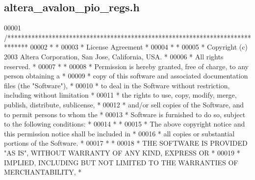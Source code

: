 \subsection{altera\+\_\+avalon\+\_\+pio\+\_\+regs.\+h}
\label{altera__avalon__pio__regs_8h_source}

\begin{DoxyCode}
00001 \textcolor{comment}{/******************************************************************************}
00002 \textcolor{comment}{*                                                                             *}
00003 \textcolor{comment}{* License Agreement                                                           *}
00004 \textcolor{comment}{*                                                                             *}
00005 \textcolor{comment}{* Copyright (c) 2003 Altera Corporation, San Jose, California, USA.           *}
00006 \textcolor{comment}{* All rights reserved.                                                        *}
00007 \textcolor{comment}{*                                                                             *}
00008 \textcolor{comment}{* Permission is hereby granted, free of charge, to any person obtaining a     *}
00009 \textcolor{comment}{* copy of this software and associated documentation files (the "Software"),  *}
00010 \textcolor{comment}{* to deal in the Software without restriction, including without limitation   *}
00011 \textcolor{comment}{* the rights to use, copy, modify, merge, publish, distribute, sublicense,    *}
00012 \textcolor{comment}{* and/or sell copies of the Software, and to permit persons to whom the       *}
00013 \textcolor{comment}{* Software is furnished to do so, subject to the following conditions:        *}
00014 \textcolor{comment}{*                                                                             *}
00015 \textcolor{comment}{* The above copyright notice and this permission notice shall be included in  *}
00016 \textcolor{comment}{* all copies or substantial portions of the Software.                         *}
00017 \textcolor{comment}{*                                                                             *}
00018 \textcolor{comment}{* THE SOFTWARE IS PROVIDED "AS IS", WITHOUT WARRANTY OF ANY KIND, EXPRESS OR  *}
00019 \textcolor{comment}{* IMPLIED, INCLUDING BUT NOT LIMITED TO THE WARRANTIES OF MERCHANTABILITY,    *}

\end{DoxyCode}
